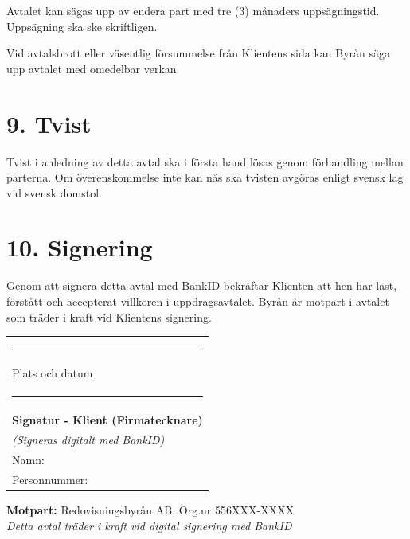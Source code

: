 \documentclass[a4paper,11pt]{article}
\begin{document}
Avtalet kan sägas upp av endera part med tre (3) månaders uppsägningstid. Uppsägning ska ske skriftligen.

Vid avtalsbrott eller väsentlig försummelse från Klientens sida kan Byrån säga upp avtalet med omedelbar verkan.

\section*{9. Tvist}

Tvist i anledning av detta avtal ska i första hand lösas genom förhandling mellan parterna. Om överenskommelse inte kan nås ska tvisten avgöras enligt svensk lag vid svensk domstol.

\vspace{1.5cm}

\section*{10. Signering}

Genom att signera detta avtal med BankID bekräftar Klienten att hen har läst, förstått och accepterat villkoren i uppdragsavtalet. Byrån är motpart i avtalet som träder i kraft vid Klientens signering.

\vspace{1cm}

\noindent\begin{tabular}{@{}p{14cm}@{}}
  \rule{13cm}{0.4pt} \\
  Plats och datum \\[0.5cm]
  
  \rule{13cm}{0.4pt} \\
  \textbf{Signatur - Klient (Firmatecknare)} \\
  \textit{(Signeras digitalt med BankID)} \\[0.5cm]
  
  Namn: \underline{\hspace{8cm}} \\[0.3cm]
  Personnummer: \underline{\hspace{8cm}} \\
\end{tabular}

\vspace{1.5cm}

\begin{center}
  \small
  \textbf{Motpart:} Redovisningsbyrån AB, Org.nr 556XXX-XXXX\\
  \textit{Detta avtal träder i kraft vid digital signering med BankID}
\end{center}
\end{document}
